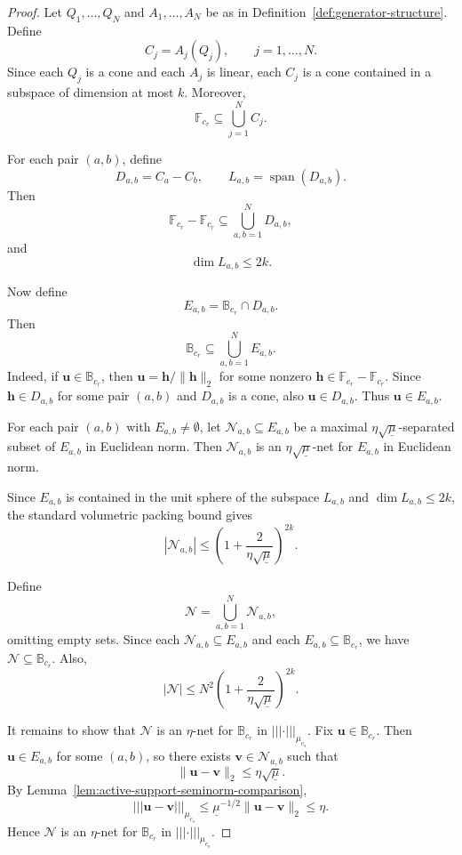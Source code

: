 \documentclass{article}
\theoremstyle{plain}
\theoremstyle{definition}
\theoremstyle{remark}
\newcommand*{\snorm}[2]{\left\vert\!\left\vert\!\left\vert #1 \right\vert\!\right\vert\!\right\vert_{#2}}
\begin{document}
\begin{proof}
  Let $Q_1,\dots,Q_{N}$ and
  $A_1,\dots,A_{N}$ be as in
  Definition~\ref{def:generator-structure}. Define
  \[
    C_j=A_j(Q_j),
    \qquad
    j=1,\dots,N.
  \]
  Since each $Q_j$ is a cone and each $A_j$ is linear, each $C_j$ is a cone
  contained in a subspace of dimension at most $k$. Moreover,
  \[
    \mathbb F_{c_r}
    \subseteq
    \bigcup_{j=1}^{N} C_j.
  \]

  For each pair $(a,b)$, define
  \[
    D_{a,b}=C_a-C_b,
    \qquad
    L_{a,b}=\operatorname{span}(D_{a,b}).
  \]
  Then
  \[
    \mathbb F_{c_r}-\mathbb F_{c_r}
    \subseteq
    \bigcup_{a,b=1}^{N}D_{a,b},
  \]
  and
  \[
    \dim L_{a,b}\leq 2k.
  \]

  Now define
  \[
    E_{a,b}
    =
    \mathbb B_{c_r}\cap D_{a,b}.
  \]
  Then
  \[
    \mathbb B_{c_r}
    \subseteq
    \bigcup_{a,b=1}^{N} E_{a,b}.
  \]
  Indeed, if $\mathbf u\in\mathbb B_{c_r}$, then
  $\mathbf u=\mathbf h/\|\mathbf h\|_2$ for some nonzero
  $\mathbf h\in\mathbb F_{c_r}-\mathbb F_{c_r}$. Since
  $\mathbf h\in D_{a,b}$ for some pair $(a,b)$ and $D_{a,b}$ is a cone, also
  $\mathbf u\in D_{a,b}$. Thus $\mathbf u\in E_{a,b}$.

  For each pair $(a,b)$ with $E_{a,b}\neq\emptyset$, let
  $\mathcal N_{a,b}\subseteq E_{a,b}$ be a maximal
  $\eta\sqrt{\underline\mu}$-separated subset of $E_{a,b}$ in
  Euclidean norm. Then $\mathcal N_{a,b}$ is an
  $\eta\sqrt{\underline\mu}$-net for $E_{a,b}$ in Euclidean norm.

  Since $E_{a,b}$ is contained in the unit sphere of the subspace $L_{a,b}$
  and $\dim L_{a,b}\leq 2k$, the standard volumetric packing bound gives
  \[
    |\mathcal N_{a,b}|
    \leq
    \left(
      1+
      \frac{2}
      {\eta\sqrt{\underline\mu}}
    \right)^{2k}.
  \]

  Define
  \[
    \mathcal N
    =
    \bigcup_{a,b=1}^{N}\mathcal N_{a,b},
  \]
  omitting empty sets. Since each $\mathcal N_{a,b}\subseteq E_{a,b}$ and
  each $E_{a,b}\subseteq\mathbb B_{c_r}$, we have
  $
    \mathcal N\subseteq\mathbb B_{c_r}.
  $
  Also,
  \[
    |\mathcal N|
    \leq
    N^2
    \left(
      1+
      \frac{2}
      {\eta\sqrt{\underline\mu}}
    \right)^{2k}.
  \]

  It remains to show that $\mathcal N$ is an $\eta$-net for
  $\mathbb B_{c_r}$ in $\snorm{\cdot}{\mu_{c_s}}$. Fix
  $\mathbf u\in\mathbb B_{c_r}$. Then $\mathbf u\in E_{a,b}$ for some
  $(a,b)$, so there exists $\mathbf v\in\mathcal N_{a,b}$ such that
  \[
    \|\mathbf u-\mathbf v\|_2
    \leq
    \eta\sqrt{\underline\mu}.
  \]
  By Lemma~\ref{lem:active-support-seminorm-comparison},
  \[
    \snorm{\mathbf u-\mathbf v}{\mu_{c_s}}
    \leq
    \underline\mu^{-1/2}
    \|\mathbf u-\mathbf v\|_2
    \leq
    \eta.
  \]
  Hence $\mathcal N$ is an $\eta$-net for $\mathbb B_{c_r}$ in
  $\snorm{\cdot}{\mu_{c_s}}$.
\end{proof}
\end{document}
